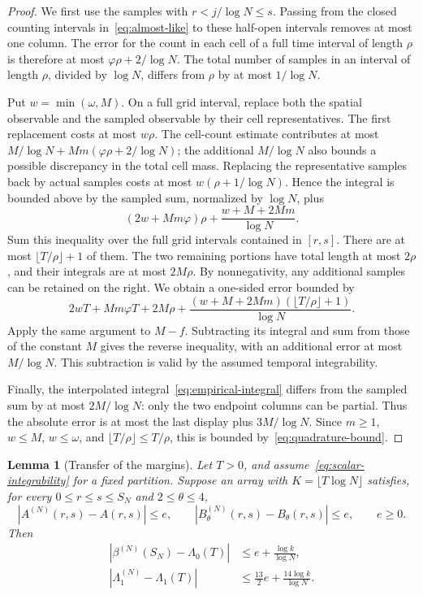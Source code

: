 \documentclass[11pt]{article}
\numberwithin{equation}{section}
\newtheorem{lemma}[theorem]{Lemma}
\theoremstyle{definition}
\theoremstyle{remark}
\newcommand{\1}{\mathbf 1}
\begin{document}
\begin{proof}
We first use the samples with $r<j/\log N\le s$. Passing from the
closed counting intervals in~\eqref{eq:almost-like} to these
half-open intervals removes at most one column. The error for the
count in each cell of a full time interval of length $\rho$ is
therefore at most $\varphi\rho+2/\log N$. The total number of samples
in an interval of length $\rho$, divided by $\log N$, differs from
$\rho$ by at most $1/\log N$.

Put $w=\min(\omega,M)$. On a full grid interval, replace both the
spatial observable and the sampled observable by their cell
representatives. The first replacement costs at most $w\rho$.
The cell-count estimate contributes at most
$M/\log N+Mm(\varphi\rho+2/\log N)$; the additional
$M/\log N$ also bounds a possible discrepancy in the total cell
mass. Replacing the representative samples back by actual samples
costs at most $w(\rho+1/\log N)$. Hence the integral is bounded above
by the sampled sum, normalized by $\log N$, plus
\[
 (2w+Mm\varphi)\rho+\frac{w+M+2Mm}{\log N}.
\]
Sum this inequality over the full grid intervals contained in
$[r,s]$. There are at most $\lfloor T/\rho\rfloor+1$ of them.
The two remaining portions have total length at most $2\rho$,
and their integrals are at most $2M\rho$. By nonnegativity, any
additional samples can be retained on the right. We obtain a
one-sided error bounded by
\[
 2wT+Mm\varphi T+2M\rho+
 \frac{(w+M+2Mm)(\lfloor T/\rho\rfloor+1)}{\log N}.
\]
Apply the same argument to $M-f$. Subtracting its integral and sum
from those of the constant $M$ gives the reverse inequality, with
an additional error at most $M/\log N$. This subtraction is valid
by the assumed temporal integrability.

Finally, the interpolated integral~\eqref{eq:empirical-integral}
differs from the sampled sum by at most $2M/\log N$: only the two
endpoint columns can be partial. Thus the absolute error is at most
the last display plus $3M/\log N$. Since $m\ge1$, $w\le M$,
$w\le\omega$, and $\lfloor T/\rho\rfloor\le T/\rho$, this is
bounded by~\eqref{eq:quadrature-bound}.
\end{proof}

\begin{lemma}[Transfer of the margins]%
\label{lem:margin-transfer}
Let $T>0$, and assume~\eqref{eq:scalar-integrability} for a fixed
partition. Suppose an array with $K=\lfloor T\log N\rfloor$ satisfies,
for every $0\le r\le s\le S_N$ and $2\le\theta\le4$,
\begin{equation}\label{eq:interval-transfer}
 |A^{(N)}(r,s)-A(r,s)|\le e,\qquad
 |B^{(N)}_\theta(r,s)-B_\theta(r,s)|\le e,
 \qquad e\ge0.
\end{equation}
Then
\begin{align}\label{eq:margin-transfer}
 |\beta^{(N)}(S_N)-\Lambda_0(T)|&\le e+\frac{\log k}{\log N},\nonumber\\
 |\Lambda_1^{(N)}-\Lambda_1(T)|&\le\frac{13}{2}e+
                                          \frac{14\log k}{\log N}.
\end{align}
\end{lemma}
\end{document}

